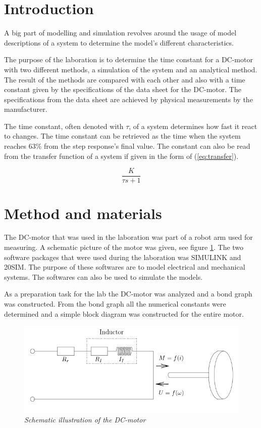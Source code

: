 \documentclass[12pt,a4paper]{article}
\begin{document}
\newpage

\tableofcontents

\newpage

\section{Introduction}
A big part of modelling and simulation revolves around the usage of model descriptions of a system to determine the model's different characteristics.

The purpose of the laboration is to determine the time constant for a DC-motor with two different methods, a simulation of the system and an analytical method. The result of the methods are compared with each other and also with a time constant given by the specifications of the data sheet for the DC-motor. The specifications from the data sheet are achieved by physical measurements by the manufacturer.

The time constant, often denoted with $\tau$, of a system determines how fast it react to changes. The time constant can be retrieved as the time when the system reaches 63\% from the step response's final value. The constant can also be read from the transfer function of a system if given in the form of (\ref{eq:transfer}).

\begin{equation}
\label{eq:transfer}
\frac{K}{\tau s+1}
\end{equation}

\section{Method and materials}
The DC-motor that was used in the laboration was part of a robot arm used for measuring. A schematic picture of the motor was given, see figure \ref{fig:dcmoto}.
The two software packages that were used during the laboration was SIMULINK and 20SIM. The purpose of these softwares are to model electrical and mechanical systems. The softwares can also be used to simulate the models.

As a preparation task for the lab the DC-motor was analyzed and a bond graph was constructed. From the bond graph all the numerical constants were determined and a simple block diagram was constructed for the entire motor.
\begin{figure}
  \centering
  \includegraphics[width=1\linewidth]{schematicdcmotor.png}
  \caption{\emph{Schematic illustration of the DC-motor}}
  \label{fig:dcmoto}
\end{figure}
\end{document}
